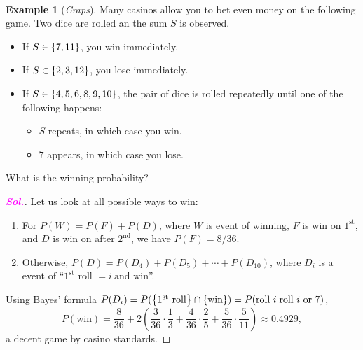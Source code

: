 \documentclass[12pt,a4paper]{article}
\theoremstyle{definition}
\newtheorem{example}{Example}[section]
\theoremstyle{definition}
\theoremstyle{definition}
\theoremstyle{definition}
\theoremstyle{remark}
\theoremstyle{definition}
\newcommand{\sol}{\textcolor{magenta}{\bf \textit{Sol.}}\quad}
\begin{document}
\
\begin{example}[\it Craps]
	Many casinos allow you to bet even money on the following game. Two dice are rolled an the sum $S$ is observed. \begin{itemize}
		\item If $S\in\set{7,11}$, you win immediately.
		\item If $S\in\set{2,3,12}$, you lose immediately.
		\item If $S\in\set{4,5,6,8,9,10}$, the pair of dice is rolled repeatedly until one of the following happens: \begin{itemize}
			\item $S$ repeats, in which case you win.
			\item $7$ appears, in which case you lose.
		\end{itemize}
	\end{itemize} What is the winning probability?\begin{proof}[\sol]
	Let us look at all possible ways to win: \begin{enumerate}
		\item For $P(W)=P(F)+P(D)$, where $W$ is event of winning, $F$ is win on $1^{\text{st}}$, and $D$ is win on after $2^{\text{nd}}$, we have $P(F)=8/36$.
		\item Otherwise, $P(D)=P(D_4)+P(D_5)+\cdots+P(D_10)$, where $D_i$ is a event of ``$1^{\text{st}}$ roll $= i\ \text{and win}$''.
	\end{enumerate} Using Bayes' formula $P(D_i)=P(\set{1^{\text{st}}\ \text{roll}}\cap\set{\text{win}})=P(\text{roll}\ i|\text{roll}\ i\ \text{or}\ 7)$, \[
	P(\text{win})=\frac{8}{36}+2\left(\frac{3}{36}\cdot\frac{1}{3}+\frac{4}{36}\cdot\frac{2}{5}+\frac{5}{36}\cdot\frac{5}{11}\right)\approx0.4929,
	\] a decent game by casino standards.
	\end{proof}
\end{example}
\end{document}
